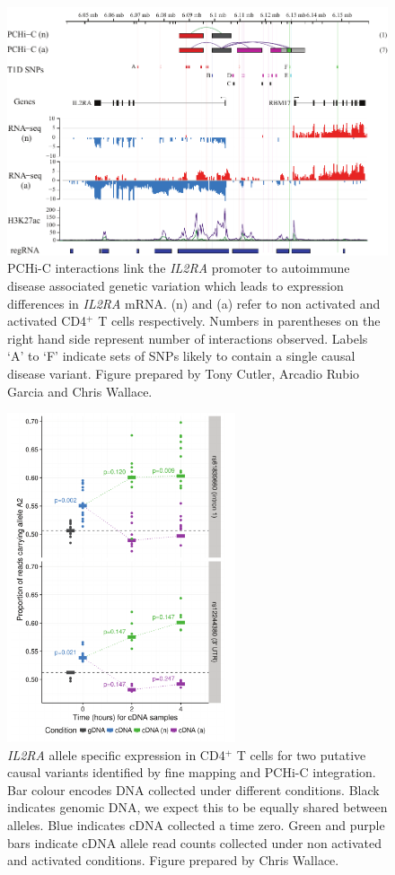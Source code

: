 \documentclass[a4paper,11pt]{report}
\begin{document}
\begin{figure}[h]
\centering
\includegraphics[width=\textwidth]{il2ra_ase_region.pdf}
\caption{PCHi-C interactions link the \textit{IL2RA} promoter to autoimmune disease associated genetic variation which leads to expression differences in \textit{IL2RA} mRNA. (n) and (a) refer to non activated and activated CD4$^+$ T cells respectively. Numbers in parentheses on the right hand side represent number of interactions observed. Labels `A' to `F' indicate sets of SNPs likely to contain a single causal disease variant.  Figure prepared by Tony Cutler, Arcadio Rubio Garcia and Chris Wallace.}
\label{fig:il2ra_ase_region}
\end{figure}

\begin{figure}[h]
\centering
\includegraphics[width=0.6\textwidth]{il2ra_ase_tc.pdf}
\caption{\textit{IL2RA} allele specific expression in CD4$^{+}$ T cells for two putative causal variants identified by fine mapping and PCHi-C integration. Bar colour encodes DNA collected under different conditions. Black indicates genomic DNA, we expect this to be equally shared between alleles. Blue indicates cDNA collected a time zero. Green and purple bars indicate cDNA allele read counts collected under non activated and activated conditions. Figure prepared by Chris Wallace.}
\label{fig:il2ra_ase_tc}
\end{figure}
\end{document}
